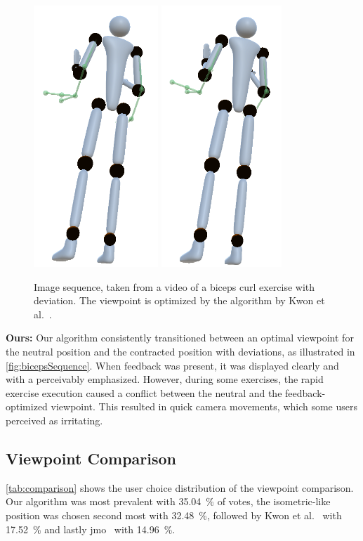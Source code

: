 \begin{figure}[h!]
	\includegraphics[width=0.12\linewidth]{pictures/kwonSequence7.png}\hfill
	\includegraphics[width=0.115\linewidth]{pictures/kwonSequence8.png}\hfill
	\caption[Image sequence optimized by Kwon et al.~\cite{kwon2020ocp}.]{Image sequence, taken from a video of a biceps curl exercise with deviation. The viewpoint is optimized by the algorithm by Kwon et al.~\cite{kwon2020ocp}.}
	\label{fig:kwonSequence}
\end{figure}

\textbf{Ours:}
Our algorithm consistently transitioned between an optimal viewpoint for the neutral position and the contracted position with deviations, as illustrated in \autoref{fig:bicepsSequence}. When feedback was present, it was displayed clearly and with a perceivably emphasized. However, during some exercises, the rapid exercise execution caused a conflict between the neutral and the feedback-optimized viewpoint. This resulted in quick camera movements, which some users perceived as irritating.

\subsection{Viewpoint Comparison \label{sec:results:comparison}}
\autoref{tab:comparison} shows the user choice distribution of the viewpoint comparison. Our algorithm was most prevalent with 35.04~\% of votes, the isometric-like position was chosen second most with 32.48~\%, followed by Kwon et al.~\cite{kwon2020ocp} with 17.52~\% and lastly \acrshort{jmo}~\cite{ishara2015mra} with 14.96~\%.

